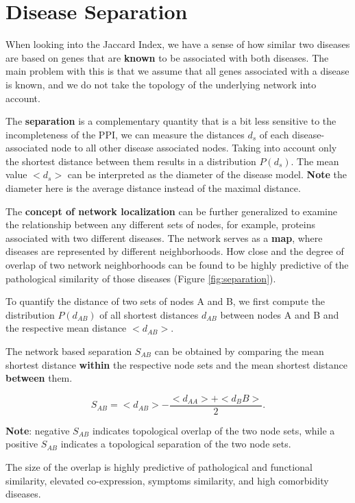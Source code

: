 \documentclass[
]{book}
\begin{document}
\hypertarget{dissep}{%
\section{Disease Separation}\label{dissep}}

When looking into the Jaccard Index, we have a sense of how similar two diseases are based on genes that are \textbf{known} to be associated with both diseases. The main problem with this is that we assume that all genes associated with a disease is known, and we do not take the topology of the underlying network into account.

The \textbf{separation} is a complementary quantity that is a bit less sensitive to the incompleteness of the PPI, we can measure the distances \(d_s\) of each disease-associated node to all other disease associated nodes. Taking into account only the shortest distance between them results in a distribution \(P(d_s)\). The mean value \(<d_s>\) can be interpreted as the diameter of the disease model. \textbf{Note} the diameter here is the average distance instead of the maximal distance.

The \textbf{concept of network localization} can be further generalized to examine the relationship between any different sets of nodes, for example, proteins associated with two different diseases.
The network serves as a \textbf{map}, where diseases are represented by different neighborhoods.
How close and the degree of overlap of two network neighborhoods can be found to be highly predictive of the pathological similarity of those diseases \citep{Menche2015} (Figure \ref{fig:separation}).

To quantify the distance of two sets of nodes A and B, we first compute the distribution \(P(d_{AB})\) of all shortest distances \(d_{AB}\) between nodes A and B and the respective mean distance \(<d_{AB}>\).

The network based separation \(S_{AB}\) can be obtained by comparing the mean shortest distance \textbf{within} the respective node sets and the mean shortest distance \textbf{between} them.

\[
S_{AB} = <d_{AB}> - \frac{<d_{AA}> + <d_BB>}{2}.
\]

\textbf{Note}: negative \(S_{AB}\) indicates topological overlap of the two node sets, while a positive \(S_{AB}\) indicates a topological separation of the two node sets.

The size of the overlap is highly predictive of pathological and functional similarity, elevated co-expression, symptoms similarity, and high comorbidity diseases.
\end{document}
